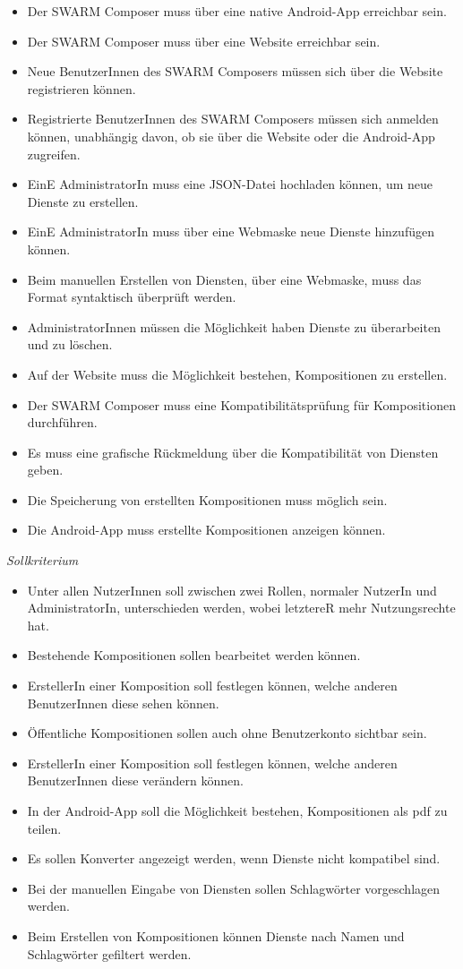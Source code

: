 \begin{itemize}[leftmargin=4pc]
	\item Der SWARM Composer muss über eine native Android-App erreichbar sein.
	\item Der SWARM Composer muss über eine Website erreichbar sein.
	\item Neue BenutzerInnen des SWARM Composers müssen sich über die Website registrieren können.
	\item Registrierte BenutzerInnen des SWARM Composers müssen sich anmelden können, unabhängig davon, ob sie über die Website oder die Android-App zugreifen.
	\item EinE AdministratorIn muss eine JSON-Datei hochladen können, um neue Dienste zu erstellen.
	\item EinE AdministratorIn muss über eine Webmaske neue Dienste hinzufügen können.
	\item Beim manuellen Erstellen von Diensten, über eine Webmaske, muss das Format syntaktisch überprüft werden.
	\item AdministratorInnen müssen die Möglichkeit haben Dienste zu überarbeiten und zu löschen.
	\item Auf der Website muss die Möglichkeit bestehen, Kompositionen zu erstellen.
	\item Der SWARM Composer muss eine Kompatibilitätsprüfung für Kompositionen durchführen.
	\item Es muss eine grafische Rückmeldung über die Kompatibilität von Diensten geben.
	\item Die Speicherung von erstellten Kompositionen muss möglich sein.
	\item Die Android-App muss erstellte Kompositionen anzeigen können.
\end{itemize}

\textit{Sollkriterium}

\begin{itemize}[leftmargin=4pc]
	\item Unter allen NutzerInnen soll zwischen zwei Rollen, normaler NutzerIn und AdministratorIn, unterschieden werden, wobei letztereR mehr Nutzungsrechte hat.
	\item Bestehende Kompositionen sollen bearbeitet werden können.
	\item ErstellerIn einer Komposition soll festlegen können, welche anderen BenutzerInnen diese sehen können.
	\item Öffentliche Kompositionen sollen auch ohne Benutzerkonto sichtbar sein.
	\item ErstellerIn einer Komposition soll festlegen können, welche anderen BenutzerInnen diese verändern können.
	\item In der Android-App soll die Möglichkeit bestehen, Kompositionen als pdf zu teilen.
	\item Es sollen Konverter angezeigt werden, wenn Dienste nicht kompatibel sind.
	\item Bei der manuellen Eingabe von Diensten sollen Schlagwörter vorgeschlagen werden.
	\item Beim Erstellen von Kompositionen können Dienste nach Namen und Schlagwörter gefiltert werden.
\end{itemize}

